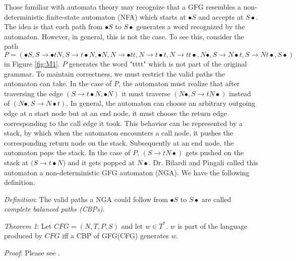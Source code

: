 \documentclass{sigplanconf}
\begin{document}
Those familiar with automata theory may recognize that a GFG resembles a non-deterministic finite-state automaton (NFA) which starts at $\bullet{S}$ and accepts at $S\bullet$. The idea is that each path from $\bullet{S}$ to $S\bullet$ generates a word recognized by the automaton. However, in general, this is not the case. To see this, consider the path $P = (\bullet{S}, S\longrightarrow{\bullet{tN}}, S\longrightarrow{t\bullet{N}}, \bullet{N}, N\longrightarrow{\bullet{tt}}, N\longrightarrow{t\bullet{t}}, N\longrightarrow{tt\bullet}, N\bullet, S\longrightarrow{N\bullet{t}}, S\longrightarrow{Nt\bullet}, S\bullet)$ in Figure \ref{fig:M1}. $P$ generates the word "tttt" which is not part of the original grammar. To maintain correctness, we must restrict the valid paths the automaton can take. In the case of $P$, the automaton must realize that after traversing the edge $(S\longrightarrow{t\bullet{N}}, \bullet{N})$ it must traverse $(N\bullet, S\longrightarrow{tN\bullet})$ instead of $(N\bullet, S\longrightarrow{N\bullet{t}})$. In general, the automaton can choose an arbitrary outgoing edge at a start node but at an end node, it must choose the return edge corresponding to the call edge it took. This behavior can be represented by a stack, by which when the automaton encounters a call node, it pushes the corresponding return node on the stack. Subsequently at an end node, the automaton pops the stack. In the case of $P$, $(S\longrightarrow{tN\bullet})$ gets pushed on the stack at $(S\longrightarrow{t\bullet{N}}$) and it gets popped at $N\bullet$. Dr. Bilardi and Pingali called this automaton a non-deterministic GFG automaton (NGA). We have the following definition.

\textit{Definition}: The valid paths a NGA could follow from $\bullet{S}$ to $S\bullet$ are called \textit{complete balanced paths (CBPs)}.

\textit{Theorem 1}: Let $CFG = (N, T, P, S)$ and let $w\in{T^*}$. $w$ is part of the language produced by $CFG$ iff a CBP of GFG(CFG) generates $w$.

\textit{Proof}: Please see \cite{bilardi-pingali}.
\end{document}
